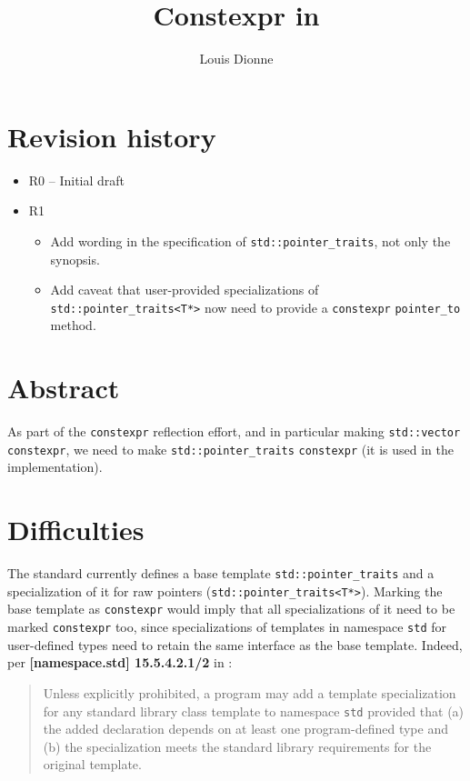 \documentclass{wg21}
\title{Constexpr in \cc{std::pointer_traits}}
\author{Louis Dionne}{ldionne.2@gmail.com}
\newcommand{\cc}[1]{\texttt{#1}}
\begin{document}
\maketitle

\section{Revision history}
\begin{itemize}
  \item R0 -- Initial draft
  \item R1 \begin{itemize}
              \item Add wording in the specification of \cc{std::pointer_traits},
                    not only the synopsis.
              \item Add caveat that user-provided specializations of
                    \cc{std::pointer_traits<T*>} now need to provide
                    a \cc{constexpr} \cc{pointer_to} method.
              \end{itemize}
\end{itemize}

\section{Abstract}
As part of the \cc{constexpr} reflection effort, and in particular making
\cc{std::vector} \cc{constexpr}, we need to make \cc{std::pointer_traits}
\cc{constexpr} (it is used in the implementation).


\section{Difficulties}
The standard currently defines a base template \cc{std::pointer_traits} and a
specialization of it for raw pointers (\cc{std::pointer_traits<T*>}). Marking
the base template as \cc{constexpr} would imply that all specializations of it
need to be marked \cc{constexpr} too, since specializations of templates in
namespace \cc{std} for user-defined types need to retain the same interface
as the base template. Indeed, per \textbf{[namespace.std] 15.5.4.2.1/2} in
\cite{N4762}:

\begin{quote}
  Unless explicitly prohibited, a program may add a template specialization for
  any standard library class template to namespace \texttt{std} provided that
  (a) the added declaration depends on at least one program-defined type and
  (b) the specialization meets the standard library requirements for the
  original template.
\end{quote}
\end{document}
